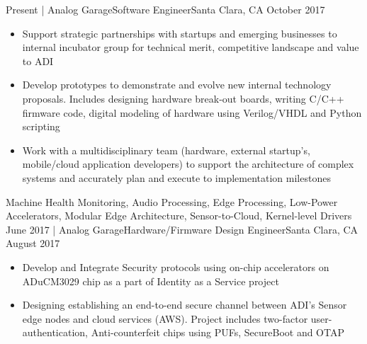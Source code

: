 %
%
%

\begin{experiences}
  \experience
    {Present}   {| Analog Garage}{Software Engineer}{Santa Clara, CA}
    {October 2017} {
                      \begin{itemize}
                        \item Support strategic partnerships with startups and emerging businesses to internal incubator group for technical merit, competitive landscape and value to ADI
                        \item Develop prototypes to demonstrate and evolve new internal technology proposals. Includes designing hardware break-out boards, writing C/C++ firmware code, digital modeling of hardware using Verilog/VHDL and Python scripting
                        \item Work with a multidisciplinary team (hardware, external startup’s, mobile/cloud application developers) to support the architecture of complex systems and accurately plan and execute to implementation milestones\\
                      \end{itemize}
                    }
                    {Machine Health Monitoring, Audio Processing, Edge Processing, Low-Power Accelerators, Modular Edge Architecture, Sensor-to-Cloud, Kernel-level Drivers}
  \emptySeparator
  \experience
    {June 2017} {| Analog Garage}{Hardware/Firmware Design Engineer}{Santa Clara, CA}
    {August 2017}    {
                      \begin{itemize}
                        \item Develop and Integrate Security protocols using on-chip accelerators on ADuCM3029 chip as a part of Identity as a Service project
                        \item Designing establishing an end-to-end secure channel between ADI's Sensor edge nodes and cloud services (AWS). Project includes two-factor user-authentication, Anti-counterfeit chips using PUFs, SecureBoot and OTAP \\

\end{itemize}}
\end{experiences}

